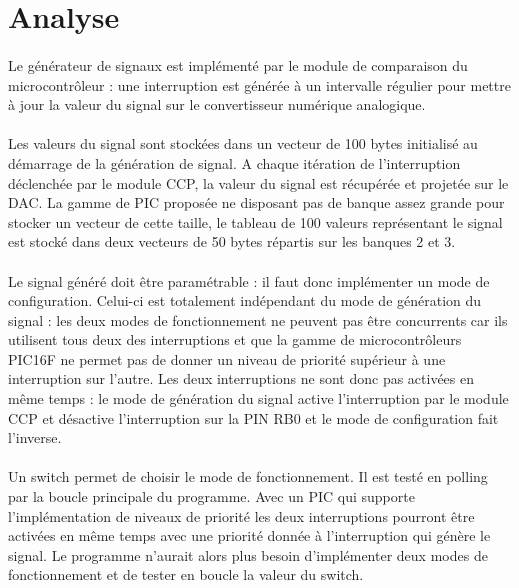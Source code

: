 \documentclass{article}
\begin{document}
    \section{Analyse}
    \paragraph{}
    Le générateur de signaux est implémenté par le module de comparaison du microcontrôleur : une interruption est générée à un intervalle régulier pour mettre à jour la valeur du signal sur le convertisseur numérique analogique.

    \paragraph{}
    Les valeurs du signal sont stockées dans un vecteur de 100 bytes initialisé au démarrage de la génération de signal. A chaque itération de l'interruption déclenchée par le module CCP, la valeur du signal est récupérée et projetée sur le DAC. La gamme de PIC proposée ne disposant pas de banque assez grande pour stocker un vecteur de cette taille, le tableau de 100 valeurs représentant le signal est stocké dans deux vecteurs de 50 bytes répartis sur les banques 2 et 3.

    \paragraph{}
    Le signal généré doit être paramétrable : il faut donc implémenter un mode de configuration. Celui-ci est totalement indépendant du mode de génération du signal : les deux modes de fonctionnement ne peuvent pas être concurrents car ils utilisent tous deux des interruptions et que la gamme de microcontrôleurs PIC16F ne permet pas de donner un niveau de priorité supérieur à une interruption sur l'autre. Les deux interruptions ne sont donc pas activées en même temps : le mode de génération du signal active l'interruption par le module CCP et désactive l'interruption sur la PIN RB0 et le mode de configuration fait l'inverse.

    \paragraph{}
    Un switch permet de choisir le mode de fonctionnement. Il est testé en polling par la boucle principale du programme. Avec un PIC qui supporte l'implémentation de niveaux de priorité les deux interruptions pourront être activées en même temps avec une priorité donnée à l'interruption qui génère le signal. Le programme n'aurait alors plus besoin d'implémenter deux modes de fonctionnement et de tester en boucle la valeur du switch.
\end{document}
